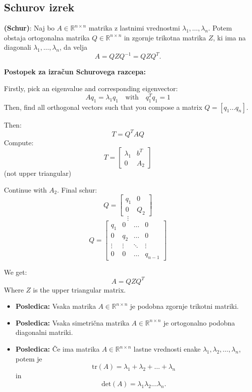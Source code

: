 \documentclass{article}
\begin{document}
\begin{multicols}{2}
	\subsection{Schurov izrek}

	\textbf{(Schur)}: Naj bo \( A \in \mathbb{R}^{n \times n} \) matrika z lastnimi vrednostmi \( \lambda_1, \ldots, \lambda_n \). Potem obstaja ortogonalna matrika \( Q \in \mathbb{R}^{n \times n} \) in zgornje trikotna matrika \( Z \), ki ima na diagonali \( \lambda_1, \ldots, \lambda_n \), da velja
	\[ A = QZQ^{-1} = QZQ^T. \]

	\textbf{Postopek za izračun Schurovega razcepa:}

	Firstly, pick an eigenvalue and corresponding eigenvector:
	\[
		Aq_1 = \lambda_1 q_1 \quad \text{with} \quad q_1^Tq_1=1
	\]
	Then, find all orthogonal vectors such that you compose a matrix \( Q = [q_1 \dots q_n] \).

	Then:
	\[
		T = Q^TAQ
	\]
	Compute:
	\[
		T = \begin{bmatrix}
			\lambda_1 & b^T \\
			0         & A_2
		\end{bmatrix}
	\]
	(not upper triangular)

	Continue with \( A_2 \). Final schur:
	\[
		Q = \begin{bmatrix}
			q_1 & 0   \\
			0   & Q_2
		\end{bmatrix}
	\]
	\[
		\vdots
	\]
	\[
		Q = \begin{bmatrix}
			q_1    & 0      & \dots  & 0       \\
			0      & q_2    & \dots  & 0       \\
			\vdots & \vdots & \ddots & \vdots  \\
			0      & 0      & \dots  & q_{n-1}
		\end{bmatrix}
	\]

	We get:
	\[
		A = QZQ^T
	\]
	Where \( Z \) is the upper triangular matrix.


	\begin{itemize}
		\item \textbf{Posledica:} Vsaka matrika \( A \in \mathbb{R}^{n \times n} \) je podobna zgornje trikotni matriki.

		\item \textbf{Posledica:} Vsaka simetrična matrika \( A \in \mathbb{R}^{n \times n} \) je ortogonalno podobna diagonalni matriki.

		\item \textbf{Posledica:} Če ima matrika \( A \in \mathbb{R}^{n \times n} \) lastne vrednosti enake \( \lambda_1, \lambda_2, \ldots, \lambda_n \), potem je
		      \[
			      \text{tr}(A) = \lambda_1 + \lambda_2 + \ldots + \lambda_n
		      \]
		      in
		      \[
			      \text{det}(A) = \lambda_1 \lambda_2 \ldots \lambda_n.
		      \]


\end{itemize}
\end{multicols}
\end{document}
